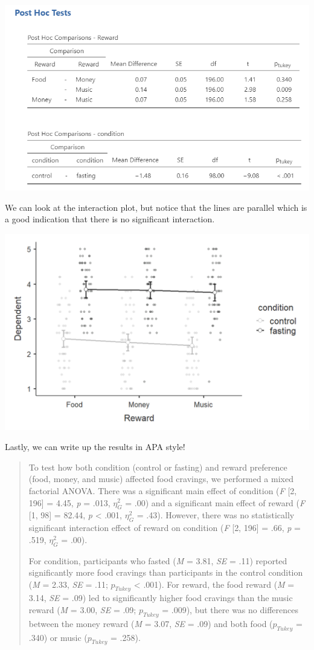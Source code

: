 \documentclass[
]{book}
\begin{document}
\includegraphics{images/06-factorial-anova/mixed_posthoc.png}

We can look at the interaction plot, but notice that the lines are parallel which is a good indication that there is no significant interaction.

\includegraphics{images/06-factorial-anova/mixed_interaction.png}

Lastly, we can write up the results in APA style!

\begin{quote}
To test how both condition (control or fasting) and reward preference (food, money, and music) affected food cravings, we performed a mixed factorial ANOVA. There was a significant main effect of condition (\emph{F} {[}2, 196{]} = 4.45, \emph{p} = .013, \(\eta^2_G\) = .00) and a significant main effect of reward (\emph{F} {[}1, 98{]} = 82.44, \emph{p} \textless{} .001, \(\eta^2_G\) = .43). However, there was no statistically significant interaction effect of reward on condition (\emph{F} {[}2, 196{]} = .66, \emph{p} = .519, \(\eta^2_G\) = .00).

For condition, participants who fasted (\emph{M} = 3.81, \emph{SE} = .11) reported significantly more food cravings than participants in the control condition (\emph{M} = 2.33, \emph{SE} = .11; \(p_{Tukey}\) \textless{} .001). For reward, the food reward (\emph{M} = 3.14, \emph{SE} = .09) led to significantly higher food cravings than the music reward (\emph{M} = 3.00, \emph{SE} = .09; \(p_{Tukey}\) = .009), but there was no differences between the money reward (\emph{M} = 3.07, \emph{SE} = .09) and both food (\(p_{Tukey}\) = .340) or music (\(p_{Tukey}\) = .258).
\end{quote}
\end{document}
